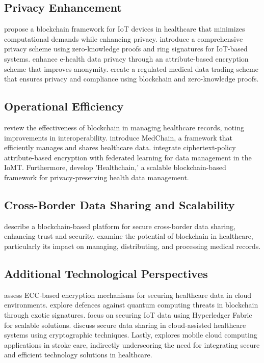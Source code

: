 \documentclass[cic,tc,english]{iiufrgs}
\begin{document}
        \subsection{Privacy Enhancement} 
            \citet{Dwivedi2019} propose a blockchain framework for IoT devices in healthcare that minimizes computational demands while enhancing privacy. \citet{Esfahani2024} introduce a comprehensive privacy scheme using zero-knowledge proofs and ring signatures for IoT-based systems. \citet{Zala2024} enhance e-health data privacy through an attribute-based encryption scheme that improves anonymity. \citet{Li2024} create a regulated medical data trading scheme that ensures privacy and compliance using blockchain and zero-knowledge proofs.
        
        \subsection{Operational Efficiency} 
            \citet{Vazirani2019} review the effectiveness of blockchain in managing healthcare records, noting improvements in interoperability. \citet{Shen2019} introduce MedChain, a framework that efficiently manages and shares healthcare data. \citet{Bhansali2022} integrate ciphertext-policy attribute-based encryption with federated learning for data management in the IoMT. Furthermore, \citet{XuJie2019} develop 'Healthchain,' a scalable blockchain-based framework for privacy-preserving health data management.
        
        \subsection{Cross-Border Data Sharing and Scalability} 
            \citet{Rahman2020} describe a blockchain-based platform for secure cross-border data sharing, enhancing trust and security. \citet{Saeed2022} examine the potential of blockchain in healthcare, particularly its impact on managing, distributing, and processing medical records.
        
        \subsection{Additional Technological Perspectives} 
            \citet{Hema2019} assess ECC-based encryption mechanisms for securing healthcare data in cloud environments. \citet{Naz2024} explore defences against quantum computing threats in blockchain through exotic signatures. \citet{Eghmazi2024} focus on securing IoT data using Hyperledger Fabric for scalable solutions. \citet{XuChang2019} discuss secure data sharing in cloud-assisted healthcare systems using cryptographic techniques. Lastly, \citet{Karaca2019} explores mobile cloud computing applications in stroke care, indirectly underscoring the need for integrating secure and efficient technology solutions in healthcare.
\end{document}
